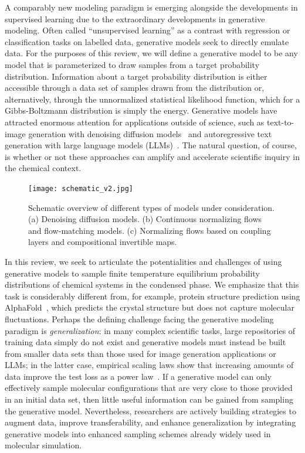 \documentclass[11pt]{article}
\begin{document}
A comparably new modeling paradigm is emerging alongside the developments in supervised learning due to the extraordinary developments in generative modeling.
Often called ``unsupervised learning'' as a contrast with regression or classification tasks on labelled data, generative models seek to directly emulate data.
For the purposes of this review, we will define a generative model to be any model that is parameterized to draw samples from a target probability distribution.
Information about a target probability distribution is either accessible through a data set of samples drawn from the distribution or, alternatively, through the unnormalized statistical likelihood function, which for a Gibbs-Boltzmann distribution is simply the energy.  
Generative models have attracted enormous attention for applications outside of science, such as text-to-image generation with denoising diffusion models~\cite{song_score-based_2022,ho_denoising_2020} and autoregressive text generation with large language models (LLMs)~\cite{vaswani_attention_2017}. 
The natural question, of course, is whether or not these approaches can amplify and accelerate scientific inquiry in the chemical context.

\begin{figure}
\begin{center}
\texttt{[image: schematic\_v2.jpg]}
\end{center}
\caption{Schematic overview of different types of models under consideration. (a) Denoising diffusion models. (b) Continuous normalizing flows and flow-matching models. (c) Normalizing flows based on coupling layers and compositional invertible maps.}
\label{fig:models}
\end{figure}

In this review, we seek to articulate the potentialities and challenges of using generative models to sample finite temperature equilibrium probability distributions of chemical systems in the condensed phase.
We emphasize that this task is considerably different from, for example, protein structure prediction using AlphaFold~\cite{jumper_highly_2021, watson_novo_2023}, which predicts the crystal structure but does not capture molecular fluctuations.
Perhaps the defining challenge facing the generative modeling paradigm is \emph{generalization}: in many complex scientific tasks, large repositories of training data simply do not exist and generative models must instead be built from smaller data sets than those used for image generation applications or LLMs; in the latter case, empirical scaling laws show that increasing amounts of data improve the test loss as a power law~\cite{kaplan_scaling_2020, bahri_explaining_2021}.
If a generative model can only effectively sample molecular configurations that are very close to those provided in an initial data set, then little useful information can be gained from sampling the generative model. 
Nevertheless, researchers are actively building strategies to augment data, improve transferability, and enhance generalization by integrating generative models into enhanced sampling schemes already widely used in molecular simulation.
\end{document}
